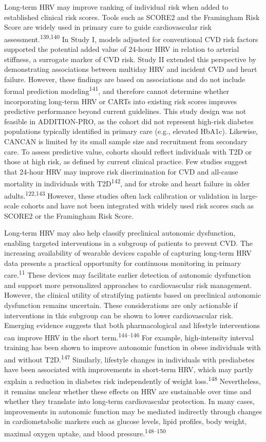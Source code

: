 \documentclass[
  a4paper,
  headsepline=true,
  open=left]{scrbook}
\begin{document}
Long-term HRV may improve ranking of individual risk when added to
established clinical risk scores. Tools such as SCORE2 and the
Framingham Risk Score are widely used in primary care to guide
cardiovascular risk assessment.\textsuperscript{139,140} In Study I,
models adjusted for conventional CVD risk factors supported the
potential added value of 24-hour HRV in relation to arterial stiffness,
a surrogate marker of CVD risk. Study II extended this perspective by
demonstrating associations between multiday HRV and incident CVD and
heart failure. However, these findings are based on associations and do
not include formal prediction modeling\textsuperscript{141}, and
therefore cannot determine whether incorporating long-term HRV or CARTs
into existing risk scores improves predictive performance beyond current
guidelines. This study design was not feasible in ADDITION-PRO, as the
cohort did not represent high-risk diabetes populations typically
identified in primary care (e.g., elevated HbA1c). Likewise, CANCAN is
limited by its small sample size and recruitment from secondary care. To
assess predictive value, cohorts should reflect individuals with T2D or
those at high risk, as defined by current clinical practice. Few studies
suggest that 24-hour HRV may improve risk discrimination for CVD and
all-cause mortality in individuals with T2D\textsuperscript{142}, and
for stroke and heart failure in older adults.\textsuperscript{122,143}
However, these studies often lack calibration or validation in
large-scale cohorts and have not been integrated with widely used risk
scores such as SCORE2 or the Framingham Risk Score.

Long-term HRV may also help classify preclinical autonomic dysfunction,
enabling targeted interventions in a subgroup of patients to prevent
CVD. The increasing availability of wearable devices capable of
capturing long-term HRV data presents a practical opportunity for
continuous monitoring in primary care.\textsuperscript{11} These devices
may facilitate earlier detection of autonomic dysfunction and support
more personalized approaches to cardiovascular risk management. However,
the clinical utility of stratifying patients based on preclinical
autonomic dysfunction remains uncertain. These considerations are only
actionable if interventions in this subgroup can be shown to lower
cardiovascular risk. Emerging evidence suggests that both
pharmacological and lifestyle interventions can improve HRV in the short
term.\textsuperscript{144--146} For example, high-intensity interval
training has been shown to improve autonomic function in obese
individuals with and without T2D.\textsuperscript{147} Similarly,
lifestyle changes in individuals with prediabetes have been associated
with improvements in short-term HRV, which may partly explain a
reduction in diabetes risk independently of weight
loss.\textsuperscript{148} Nevertheless, it remains unclear whether
these effects on HRV are sustainable over time and whether they
translate into long-term cardiovascular protection. In many cases,
improvements in autonomic function may be mediated indirectly through
changes in cardiometabolic markers such as glucose levels, lipid
profiles, body weight, maximal oxygen uptake, and blood
pressure.\textsuperscript{148--150}
\end{document}

